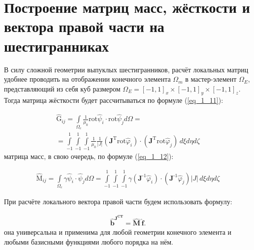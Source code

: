 \section{Построение матриц масс, жёсткости и вектора правой части на шестигранниках}

В силу сложной геометрии выпуклых шестигранников, расчёт локальных матриц удобнее проводить на отображении конечного элемента $\Omega_m$ в мастер-элемент $\Omega_E$, представляющий из себя куб размером $\Omega_E = [-1, 1]_x \times [-1, 1]_y \times [-1, 1]_z$. Тогда матрица жёсткости будет рассчитываться по формуле (\ref{eq_1_11}):

\begin{equation} \label{eq_1_11}
\begin{gathered}
	\hat{\text{G}}_{ij} = \int \limits_{\Omega_e} \frac{1}{\mu_0} \text{rot}  \hat{\text{$\psi$}}_i \cdot \text{rot} \hat{\text{$\psi$}}_j d \Omega = \\ = \int \limits_{-1}^1 \int \limits_{-1}^1 \int \limits_{-1}^1 \frac{1}{\mu_0} \frac{1}{|J|} \left( \textbf{J}^{\text{T}} \text{rot} \hat{\varphi}_i \right) \cdot \left( \textbf{J}^{\text{T}} \text{rot} \hat{\varphi}_j \right) \, d \xi d \eta d \zeta
\end{gathered}
\end{equation}
матрица масс, в свою очередь, по формуле (\ref{eq_1_12}):

\begin{equation} \label{eq_1_12}
	\begin{gathered}
		\hat{\text{M}}_{ij} = \int \limits_{\Omega_e} \gamma  \hat{\text{$\psi$}}_i \cdot \hat{\text{$\psi$}}_j d \Omega = \int \limits_{-1}^1 \int \limits_{-1}^1 \int \limits_{-1}^1 \gamma  \left( \textbf{J}^{\text{-1}} \hat{\varphi}_i \right) \cdot \left( \textbf{J}^{\text{-1}} \hat{\varphi}_j \right) |J| \, d \xi d \eta d \zeta
	\end{gathered}
\end{equation}

При расчёте локального вектора правой части будем использовать формулу:

\begin{equation} \label{eq_1_13}
	\begin{gathered}
		\hat{\textbf{b}}^{\textbf{J}^{\textbf{CT}}} = \hat{\textbf{M}} \, \hat{\textbf{f}}.
	\end{gathered}
\end{equation}
она универсальна и применима для любой геометрии конечного элемента и любыми базисными функциями любого порядка на нём.
